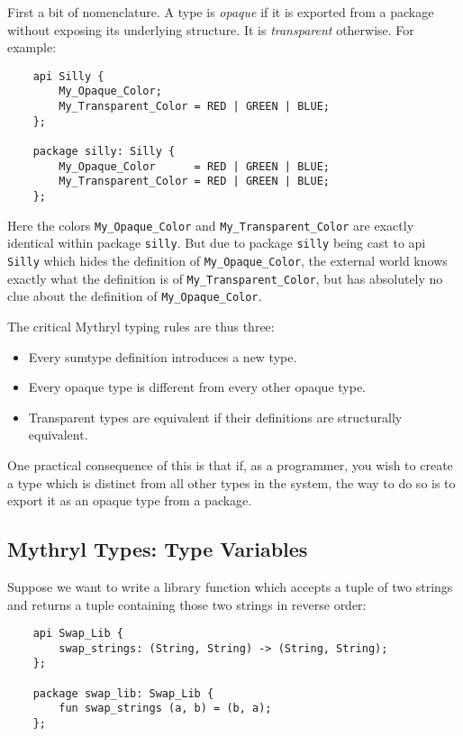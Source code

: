 First a bit of nomenclature.  A type is {\it opaque} if it is exported 
from a package without exposing its underlying structure.  It is 
{\it transparent} otherwise.  For example:

\begin{verbatim}
    api Silly {
        My_Opaque_Color;
        My_Transparent_Color = RED | GREEN | BLUE;
    };

    package silly: Silly {
        My_Opaque_Color      = RED | GREEN | BLUE;
        My_Transparent_Color = RED | GREEN | BLUE;
    };
\end{verbatim}

Here the colors {\tt My\_Opaque\_Color} and {\tt My\_Transparent\_Color} are 
exactly identical within package {\tt silly}.  But due to package {\tt silly} 
being cast to api {\tt Silly} which hides the definition of {\tt My\_Opaque\_Color}, 
the external world knows exactly what the definition is of {\tt My\_Transparent\_Color}, 
but has absolutely no clue about the definition of {\tt My\_Opaque\_Color}.

The critical Mythryl typing rules are thus three:

\begin{itemize}
\item Every sumtype definition introduces a new type.
\item Every opaque type is different from every other opaque type.
\item Transparent types are equivalent if their definitions are structurally equivalent.
\end{itemize}

One practical consequence of this is that if, as a programmer, you wish 
to create a type which is distinct from all other types in the system, 
the way to do so is to export it as an opaque type from a package.

\cutend*

\subsection{Mythryl Types:  Type Variables}

Suppose we want to write a library function which accepts a tuple of two strings 
and returns a tuple containing those two strings in reverse order:

\begin{verbatim}
    api Swap_Lib { 
        swap_strings: (String, String) -> (String, String);
    };

    package swap_lib: Swap_Lib {
        fun swap_strings (a, b) = (b, a);
    };
\end{verbatim}

